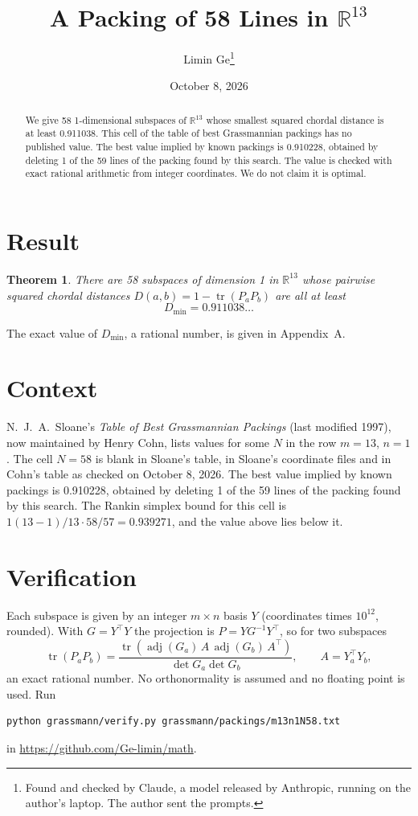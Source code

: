 \documentclass[11pt,a4paper]{article}
\title{A Packing of 58 Lines in $\mathbb{R}^{13}$}
\author{Limin Ge\thanks{Found and checked by Claude, a model released by Anthropic, running on the author's laptop. The author sent the prompts.}}
\date{October 8, 2026}
\newtheorem*{theorem}{Theorem}
\begin{document}
\maketitle
\begin{abstract}
We give 58 1-dimensional subspaces of $\mathbb{R}^{13}$ whose smallest squared chordal distance is at least 0.911038. This cell of the table of best Grassmannian packings has no published value. The best value implied by known packings is 0.910228, obtained by deleting 1 of the 59 lines of the packing found by this search. The value is checked with exact rational arithmetic from integer coordinates. We do not claim it is optimal.
\end{abstract}

\section{Result}
\begin{theorem}
There are 58 subspaces of dimension 1 in $\mathbb{R}^{13}$ whose pairwise squared chordal distances $D(a,b) = 1 - \operatorname{tr}(P_aP_b)$ are all at least
\[ D_{\min} = 0.911038\ldots \]
\end{theorem}
The exact value of $D_{\min}$, a rational number, is given in Appendix~A.


\section{Context}
N.~J.~A.~Sloane's \emph{Table of Best Grassmannian Packings} (last modified 1997), now maintained by Henry Cohn, lists values for some $N$ in the row $m=13$, $n=1$. The cell $N=58$ is blank in Sloane's table, in Sloane's coordinate files and in Cohn's table as checked on October 8, 2026. The best value implied by known packings is 0.910228, obtained by deleting 1 of the 59 lines of the packing found by this search. The Rankin simplex bound for this cell is $1(13-1)/13\cdot 58/57 = 0.939271$, and the value above lies below it.


\section{Verification}
Each subspace is given by an integer $m\times n$ basis $Y$ (coordinates times $10^{12}$, rounded). With $G=Y^\top Y$ the projection is $P=YG^{-1}Y^\top$, so for two subspaces
\[ \operatorname{tr}(P_aP_b)=\frac{\operatorname{tr}(\operatorname{adj}(G_a)\,A\,\operatorname{adj}(G_b)\,A^\top)}{\det G_a\det G_b},\qquad A=Y_a^\top Y_b, \]
an exact rational number. No orthonormality is assumed and no floating point is used. Run
\begin{verbatim}
python grassmann/verify.py grassmann/packings/m13n1N58.txt
\end{verbatim}
in \url{https://github.com/Ge-limin/math}.
\end{document}
